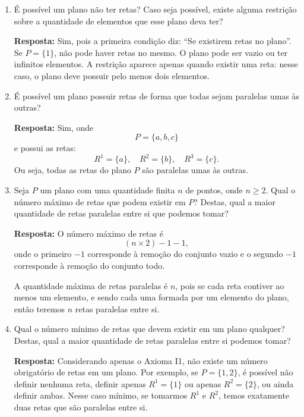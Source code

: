 \documentclass[12pt,a4paper]{article}
\begin{document}
\begin{enumerate}[label=\alph*)]

    \item É possível um plano não ter retas? Caso seja possível, existe alguma restrição sobre a quantidade de elementos que esse plano deva ter?

    \textbf{Resposta:} Sim, pois a primeira condição diz: ``Se existirem retas no plano''.  
    Se $P = \{1\}$, não pode haver retas no mesmo.  
    O plano pode ser vazio ou ter infinitos elementos. A restrição aparece apenas quando existir uma reta: nesse caso, o plano deve possuir pelo menos dois elementos.

    \vspace{0.4cm}

    \item É possível um plano possuir retas de forma que todas sejam paralelas umas às outras?

    \textbf{Resposta:} Sim, onde 
    \[
    P = \{a, b, c\}
    \]
    e possui as retas:
    \[
    R^{1} = \{a\}, \quad 
    R^{2} = \{b\}, \quad 
    R^{3} = \{c\}.
    \]
    Ou seja, todas as retas do plano $P$ são paralelas umas às outras.

    \vspace{0.4cm}

    \item Seja $P$ um plano com uma quantidade finita $n$ de pontos, onde $n \geq 2$. Qual o número máximo de retas que podem existir em $P$? Destas, qual a maior quantidade de retas paralelas entre si que podemos tomar?

    \textbf{Resposta:} O número máximo de retas é
    \[
    (n \times 2) - 1 - 1,
    \]
    onde o primeiro $-1$ corresponde à remoção do conjunto vazio e o segundo $-1$ corresponde à remoção do conjunto todo.

    A quantidade máxima de retas paralelas é $n$, pois se cada reta contiver ao menos um elemento, e sendo cada uma formada por um elemento do plano, então teremos $n$ retas paralelas entre si.

    \vspace{0.4cm}

    \item Qual o número mínimo de retas que devem existir em um plano qualquer? Destas, qual a maior quantidade de retas paralelas entre si podemos tomar?

    \textbf{Resposta:} Considerando apenas o Axioma I1, não existe um número obrigatório de retas em um plano.  
    Por exemplo, se $P = \{1,2\}$, é possível não definir nenhuma reta, definir apenas $R^1 = \{1\}$ ou apenas $R^2 = \{2\}$, ou ainda definir ambas.  
    Nesse caso mínimo, se tomarmos $R^1$ e $R^2$, temos exatamente duas retas que são paralelas entre si.  

\end{enumerate}
\end{document}
